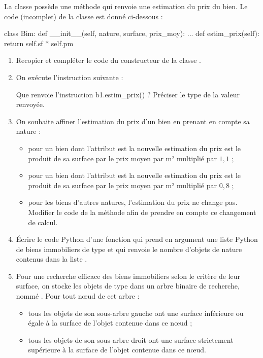 \documentclass[11pt,a4paper,french,twoside]{PMCours}
\begin{document}
La classe  possède une méthode  qui renvoie une estimation du prix du
bien. Le code (incomplet) de la classe  est donné ci-dessous :
\begin{Python*}
class Bim:
    def __init__(self, nature, surface, prix_moy):
        ...
    def estim_prix(self):
        return self.sf * self.pm
\end{Python*}

\begin{enumerate}
\item Recopier et compléter le code du constructeur de la classe .
\item On exécute l'instruction suivante :

\medskip
{}

Que renvoie l'instruction b1.estim\_prix() ? Préciser le type de la valeur renvoyée.
\item On souhaite affiner l'estimation du prix d'un bien en prenant en compte sa nature :
\begin{itemize}
\item pour un bien dont l'attribut  est  la nouvelle estimation du prix est le
produit de sa surface par le prix moyen par m² multiplié par $1,\!1$ ;
\item pour un bien dont l'attribut  est  la nouvelle estimation du prix est le
produit de sa surface par le prix moyen par m² multiplié par $0,\!8$ ;
\item pour les biens d'autres natures, l'estimation du prix ne change pas.
Modifier le code de la méthode  afin de prendre en compte ce changement
de calcul.
\end{itemize}
\item Écrire le code Python d'une fonction  qui prend en argument une liste
Python de biens immobiliers de type  et qui renvoie le nombre d'objets de nature
 contenus dans la liste .
\item Pour une recherche efficace des biens immobiliers selon le critère de leur surface, on
stocke les objets de type  dans un arbre binaire de recherche, nommé . Pour tout
nœud de cet arbre :
\begin{itemize}
\item tous les objets de son sous-arbre gauche ont une surface inférieure ou égale à la
surface de l'objet contenue dans ce nœud ;
\item tous les objets de son sous-arbre droit ont une surface strictement supérieure à la
surface de l'objet contenue dans ce nœud.
\end{itemize}


\end{enumerate}
\end{document}

